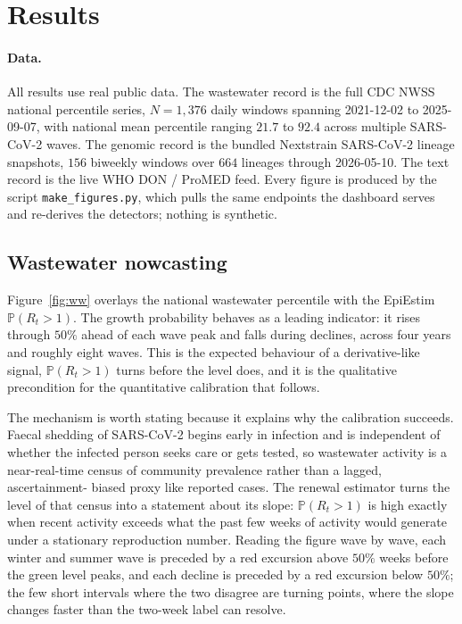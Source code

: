 \documentclass[10pt,twocolumn]{article}
\theoremstyle{definition}
\newcommand{\Rt}{R_t}
\newcommand{\Prob}{\mathbb{P}}
\newcommand{\code}[1]{\texttt{\small #1}}
\begin{document}
\section{Results}
\label{sec:results}

\paragraph{Data.}
All results use real public data. The wastewater record is the full CDC NWSS
national percentile series, $N=1{,}376$ daily windows spanning 2021-12-02 to
2025-09-07, with national mean percentile ranging $21.7$ to $92.4$ across multiple
SARS-CoV-2 waves. The genomic record is the bundled Nextstrain SARS-CoV-2 lineage
snapshots, $156$ biweekly windows over $664$ lineages through 2026-05-10. The text
record is the live WHO DON / ProMED feed. Every figure is produced by the script
\code{make\_figures.py}, which pulls the same endpoints the dashboard serves and
re-derives the detectors; nothing is synthetic.

\subsection{Wastewater nowcasting}
Figure~\ref{fig:ww} overlays the national wastewater percentile with the EpiEstim
$\Prob(\Rt>1)$. The growth probability behaves as a leading indicator: it rises
through $50\%$ ahead of each wave peak and falls during declines, across four
years and roughly eight waves. This is the expected behaviour of a
derivative-like signal, $\Prob(\Rt>1)$ turns before the level does, and it is
the qualitative precondition for the quantitative calibration that follows.

The mechanism is worth stating because it explains why the calibration succeeds.
Faecal shedding of SARS-CoV-2 begins early in infection and is independent of
whether the infected person seeks care or gets tested, so wastewater activity is a
near-real-time census of community prevalence rather than a lagged, ascertainment-
biased proxy like reported cases. The renewal estimator turns the level of
that census into a statement about its slope: $\Prob(\Rt>1)$ is high exactly
when recent activity exceeds what the past few weeks of activity would generate
under a stationary reproduction number. Reading the figure wave by wave, each
winter and summer wave is preceded by a red excursion above $50\%$ weeks before
the green level peaks, and each decline is preceded by a red excursion below
$50\%$; the few short intervals where the two disagree are turning points, where
the slope changes faster than the two-week label can resolve.
\end{document}
